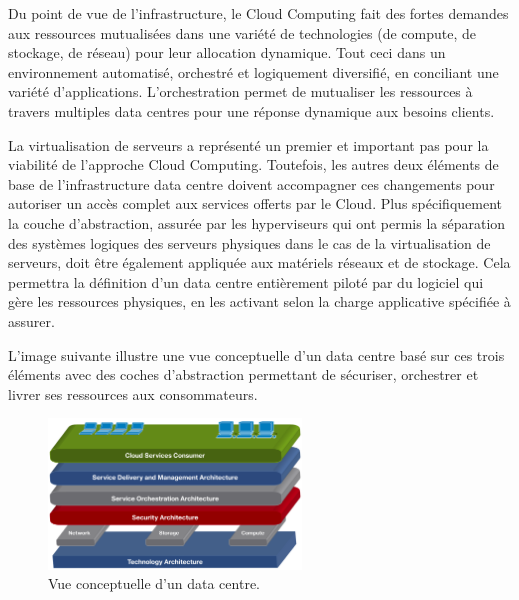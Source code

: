 Du point de vue de l'infrastructure, le Cloud Computing fait des fortes demandes aux ressources mutualisées dans une variété de technologies (de compute, de stockage, de réseau) pour leur allocation dynamique. Tout ceci dans un environnement automatisé, orchestré et logiquement diversifié, en conciliant une variété d'applications. L'orchestration permet de mutualiser les ressources à travers multiples data centres pour une réponse dynamique aux besoins clients. 


La virtualisation de serveurs a représenté un premier et important pas pour la viabilité de l'approche Cloud Computing. Toutefois, les autres deux éléments de base de l'infrastructure data centre doivent accompagner ces changements pour autoriser un accès complet aux services offerts par le Cloud. Plus spécifiquement la couche d'abstraction, assurée par les hyperviseurs qui ont permis la séparation des systèmes logiques des serveurs physiques dans le cas de la virtualisation de serveurs, doit être également appliquée aux matériels réseaux et de stockage. Cela permettra la définition d'un data centre entièrement piloté par du logiciel qui gère les ressources physiques, en les activant selon la charge applicative spécifiée à assurer.

\pagebreak

 L'image suivante illustre une vue conceptuelle d'un data centre basé sur ces trois éléments avec des coches d'abstraction permettant de sécuriser, orchestrer et livrer ses ressources aux consommateurs.

\begin{figure}[h]
\begin{center}

\includegraphics[width=0.6\textwidth]{images/CloudRefArchi} 
\caption{Vue conceptuelle d'un data centre. \cite{ciscoCCDCStrategyArchiSolutions}} \label{cloud_conceptual_view}

\end{center}
\end{figure}

